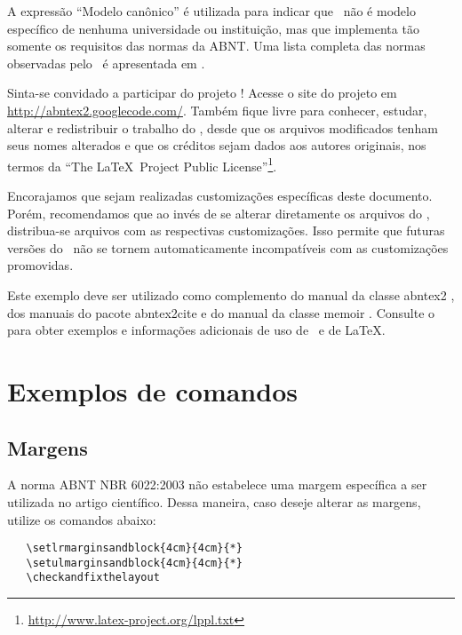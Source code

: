 \documentclass[article,11pt,oneside,a4paper,english]{abntex2}
\begin{document}
A expressão ``Modelo canônico'' é utilizada para indicar que \abnTeX\ não é
modelo específico de nenhuma universidade ou instituição, mas que implementa tão
somente os requisitos das normas da ABNT. Uma lista completa das normas
observadas pelo \abnTeX\ é apresentada em .

Sinta-se convidado a participar do projeto \abnTeX! Acesse o site do projeto em
\url{http://abntex2.googlecode.com/}. Também fique livre para conhecer,
estudar, alterar e redistribuir o trabalho do \abnTeX, desde que os arquivos
modificados tenham seus nomes alterados e que os créditos sejam dados aos
autores originais, nos termos da ``The \LaTeX\ Project Public
License''\footnote{\url{http://www.latex-project.org/lppl.txt}}.

Encorajamos que sejam realizadas customizações específicas deste documento.
Porém, recomendamos que ao invés de se alterar diretamente os arquivos do
\abnTeX, distribua-se arquivos com as respectivas customizações. Isso permite
que futuras versões do \abnTeX~não se tornem automaticamente incompatíveis com
as customizações promovidas.

Este exemplo deve ser utilizado como complemento do manual da classe
\textsf{abntex2} \cite{abntex2classe}, dos manuais do pacote
\textsf{abntex2cite} \cite{abntex2cite,abntex2cite-alf} e do manual da classe
\textsf{memoir} \cite{memoir}. Consulte o  para obter
exemplos e informações adicionais de uso de \abnTeX\ e de \LaTeX.

\section{Exemplos de comandos}

\subsection{Margens}

A norma ABNT NBR 6022:2003 não estabelece uma margem específica a ser utilizada
no artigo científico. Dessa maneira, caso deseje alterar as margens, utilize os
comandos abaixo:

\begin{verbatim}
   \setlrmarginsandblock{4cm}{4cm}{*}
   \setulmarginsandblock{4cm}{4cm}{*}
   \checkandfixthelayout
\end{verbatim}
\end{document}
